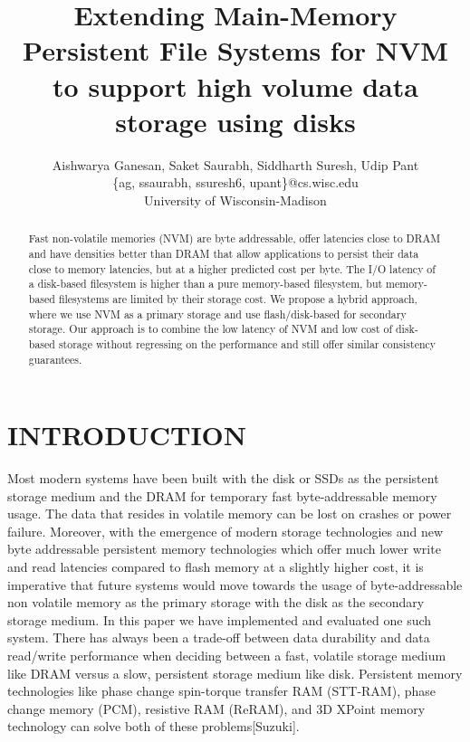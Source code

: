 \documentclass[letterpaper, 10 pt, conference]{ieeeconf}  %
\title{\LARGE \bf
Extending Main-Memory Persistent File Systems for NVM to support high volume data storage using disks
}
\author{Aishwarya Ganesan, Saket Saurabh, Siddharth Suresh, Udip Pant\\
\{ag, ssaurabh, ssuresh6, upant\}@cs.wisc.edu\\
University of Wisconsin-Madison
}
\begin{document}
\maketitle
\thispagestyle{empty}
\pagestyle{empty}


\begin{abstract}

Fast non-volatile memories (NVM) are byte addressable, offer latencies close to DRAM and have densities better than DRAM that allow applications to persist their data close to memory latencies, but at a higher predicted cost per byte. The I/O latency of a disk-based filesystem is higher than a pure memory-based filesystem, but memory-based filesystems are limited by their storage cost. We propose a hybrid approach, where we use NVM as a primary storage and use flash/disk-based for secondary storage. Our approach is to combine the low latency of NVM and low cost of disk-based storage without regressing on the performance and still offer similar consistency guarantees. 

\end{abstract}





\section{INTRODUCTION}

Most modern systems have been built with the disk or SSDs as the persistent storage medium and the DRAM for temporary fast byte-addressable memory usage. The data that resides in volatile memory can be lost on crashes or power failure. Moreover, with the emergence of modern storage technologies and new byte addressable persistent memory technologies which offer much lower write and read latencies compared to flash memory at a slightly higher cost, it is imperative that future systems would move towards the usage of byte-addressable non volatile memory as the primary storage with the disk as the secondary storage medium. In this paper we have implemented and evaluated one such system. There has always been a trade-off between data durability and data read/write performance when deciding between a fast, volatile storage medium like DRAM versus a slow, persistent storage medium like disk. Persistent memory technologies like phase change spin-torque transfer RAM (STT-RAM), phase change memory (PCM), resistive RAM (ReRAM), and 3D XPoint memory technology can solve both of these problems[Suzuki].\\
\end{document}
